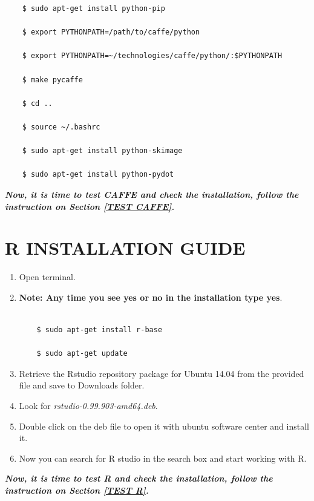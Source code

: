 \documentclass[12pt]{article}
\begin{document}
\begin{lstlisting}
    $ sudo apt-get install python-pip

    $ export PYTHONPATH=/path/to/caffe/python

    $ export PYTHONPATH=~/technologies/caffe/python/:$PYTHONPATH

    $ make pycaffe

    $ cd ..

    $ source ~/.bashrc

    $ sudo apt-get install python-skimage

    $ sudo apt-get install python-pydot
\end{lstlisting}

\textbf{\emph{Now, it is time to test CAFFE and check the installation, follow the instruction on Section \ref{TEST CAFFE}.}}

\newpage
\section{R INSTALLATION GUIDE}
\begin{enumerate}
  \item Open terminal.
  \item \textbf{Note: Any time you see yes or no in the installation type yes}.

\begin{lstlisting}

    $ sudo apt-get install r-base

    $ sudo apt-get update

\end{lstlisting}

  \item Retrieve the Rstudio  repository package for Ubuntu 14.04 from the provided file and save to Downloads folder.
  \item Look for \emph{rstudio-0.99.903-amd64.deb}.
  \item Double click on the deb file to open it with ubuntu software center and install it.
  \item Now you can search for R studio in the search box and start working with R.
\end{enumerate}

\textbf{\emph{Now, it is time to test R and check the installation, follow the instruction on Section \ref{TEST R}.}}

\newpage
\end{document}

